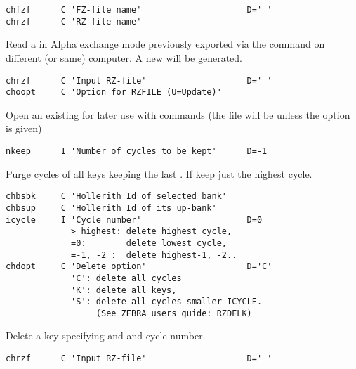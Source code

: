  
\begin{verbatim}
chfzf      C 'FZ-file name'                     D=' '
chrzf      C 'RZ-file name'
\end{verbatim}
 
Read a \FZfile{} in Alpha exchange mode previously exported via the
command  on different (or same) computer. 
A new \RZfile{} will be generated.
 
 
\begin{verbatim}
chrzf      C 'Input RZ-file'                    D=' '
choopt     C 'Option for RZFILE (U=Update)'
\end{verbatim}
 
Open an existing \RZfile{} for later use with  
commands
(the file will be  unless the  option is given)
 
 
\begin{verbatim}
nkeep      I 'Number of cycles to be kept'      D=-1
\end{verbatim}
 
Purge cycles of all keys keeping the last .
If  keep just the highest cycle.
 
 
\begin{verbatim}
chbsbk     C 'Hollerith Id of selected bank'
chbsup     C 'Hollerith Id of its up-bank'
icycle     I 'Cycle number'                     D=0
             > highest: delete highest cycle,
             =0:        delete lowest cycle,
             =-1, -2 :  delete highest-1, -2..
chdopt     C 'Delete option'                    D='C'
             'C': delete all cycles
             'K': delete all keys,
             'S': delete all cycles smaller ICYCLE.
                  (See ZEBRA users guide: RZDELK)
\end{verbatim}
 
Delete a key specifying  and  and cycle number.
 
 
\begin{verbatim}
chrzf      C 'Input RZ-file'                    D=' '
\end{verbatim}
 
